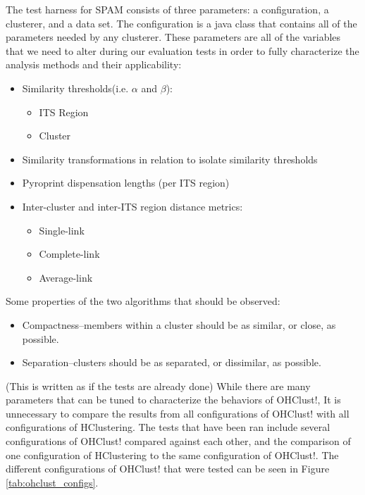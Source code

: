 \documentclass[12pt]{ucthesis}
\begin{document}
      The test harness for SPAM consists of three parameters: a configuration,
      a clusterer, and a data set. The configuration is a java class that
      contains all of the parameters needed by any clusterer. These
      parameters are all of the variables that we need to alter during our
      evaluation tests in order to fully characterize the analysis methods and
      their applicability:
      \begin{itemize}
         \item Similarity thresholds(i.e. $\alpha$ and $\beta$):
               \begin{itemize}
                  \item ITS Region
                  \item Cluster
               \end{itemize}
         \item Similarity transformations in relation to isolate similarity
               thresholds
         \item Pyroprint dispensation lengths (per ITS region)
         \item Inter-cluster and inter-ITS region distance metrics:
               \begin{itemize}
                  \item Single-link
                  \item Complete-link
                  \item Average-link
               \end{itemize}
      \end{itemize}
      Some properties of the two algorithms that should be observed:
      \begin{itemize}
         \item Compactness--members within a cluster should be as similar, or
               close, as possible.
         \item Separation--clusters should be as separated, or dissimilar, as
               possible.
      \end{itemize}

      (This is written as if the tests are already done) While there are many
      parameters that can be tuned to characterize the behaviors of \textsf{OHClust!},
      It is unnecessary to compare the results from all configurations of
      \textsf{OHClust!} with all configurations of HClustering. The tests that have been
      ran include several configurations of \textsf{OHClust!} compared against each other, and the
      comparison of one configuration of HClustering to the same configuration
      of \textsf{OHClust!}. The different configurations of \textsf{OHClust!} that were tested
      can be seen in Figure \ref{tab:ohclust_configs}.
\end{document}
